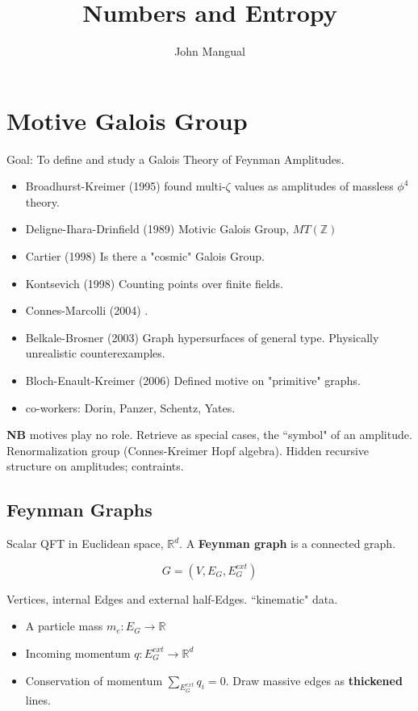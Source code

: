 \documentclass[12pt]{article}
\title{Numbers and Entropy}
\author{John Mangual}
\date{}
\begin{document}
{\selectfont

\maketitle

\section{Motive Galois Group}

Goal: To define and study a Galois Theory of Feynman Amplitudes. 

\begin{itemize}
\item Broadhurst-Kreimer (1995) found multi-$\zeta$ values as amplitudes of massless $\phi^4$ theory.
\item Deligne-Ihara-Drinfield (1989) Motivic Galois Group, $MT(\mathbb{Z})$
\item Cartier (1998) Is there a "cosmic" Galois Group.
\item Kontsevich (1998) Counting points over finite fields.
\item Connes-Marcolli (2004) {\color{gray}{Cosmic Galois Group related to renormalization}}.
\item Belkale-Brosner (2003) Graph hypersurfaces of general type.  Physically unrealistic counterexamples.
\item Bloch-Enault-Kreimer (2006) Defined motive on "primitive" graphs.
\item co-workers: Dorin, Panzer, Schentz, Yates.  {}
\end{itemize}

\noindent \textbf{NB} motives play no role.  Retrieve as special cases, the ``symbol" of an amplitude.  Renormalization group (Connes-Kreimer Hopf algebra).  Hidden recursive structure on amplitudes; contraints.

\subsection{Feynman Graphs}

Scalar QFT in Euclidean space, $\mathbb{R}^d$.  A \textbf{Feynman graph} is a connected graph.

$$ G = (V, E_G, E_G^{ext}) $$

\noindent Vertices, internal Edges and external half-Edges.  ``kinematic" data.
\begin{itemize}
\item A particle mass $m_e: E_G \to \mathbb{R}$
\item Incoming momentum $q: E_G^{ext} \to \mathbb{R}^d$
\item Conservation of momentum $\displaystyle \sum_{E_G^{ext}} q_i = 0$.  Draw massive edges as \textbf{thickened} lines.
\end{itemize}

}
\end{document}
